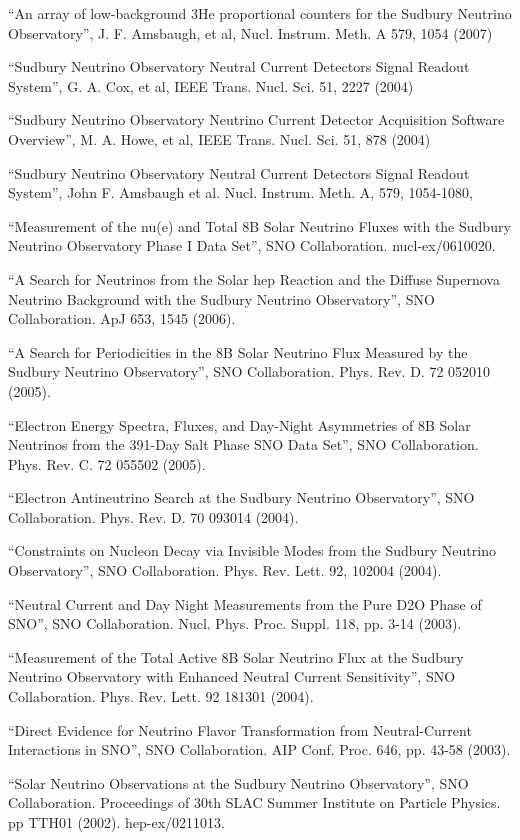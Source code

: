 \documentclass[11pt, a4paper]{article}
\begin{document}
“An array of low-background 3He proportional counters for the Sudbury Neutrino Observatory”, J. F. Amsbaugh, et al, Nucl. Instrum. Meth. A 579, 1054 (2007)

“Sudbury Neutrino Observatory Neutral Current Detectors Signal Readout System”, G. A. Cox, et al, IEEE Trans. Nucl. Sci. 51, 2227 (2004)

“Sudbury Neutrino Observatory Neutrino Current Detector Acquisition Software Overview”, M. A. Howe, et al, IEEE Trans. Nucl. Sci. 51, 878 (2004)

“Sudbury Neutrino Observatory Neutral Current Detectors Signal Readout System”, John F. Amsbaugh et al. Nucl. Instrum. Meth. A, 579, 1054-1080, 

“Measurement of the nu(e) and Total 8B Solar Neutrino Fluxes with the Sudbury Neutrino Observatory Phase I Data Set”, SNO Collaboration.  nucl-ex/0610020.

“A Search for Neutrinos from the Solar hep Reaction and the Diffuse Supernova Neutrino Background with the Sudbury Neutrino Observatory”, SNO Collaboration. ApJ 653, 1545 (2006).

“A Search for Periodicities in the 8B Solar Neutrino Flux Measured by the Sudbury Neutrino Observatory”, SNO Collaboration. Phys. Rev. D. 72 052010 (2005).

“Electron Energy Spectra, Fluxes, and Day-Night Asymmetries of 8B Solar Neutrinos from the 391-Day Salt Phase SNO Data Set”, SNO Collaboration. Phys. Rev. C. 72 055502 (2005).

“Electron Antineutrino Search at the Sudbury Neutrino Observatory”, SNO Collaboration.  Phys. Rev. D. 70 093014 (2004).

“Constraints on Nucleon Decay via Invisible Modes from the Sudbury Neutrino Observatory”, SNO Collaboration.  Phys. Rev. Lett. 92, 102004 (2004).

“Neutral Current and Day Night Measurements from the Pure D2O Phase of SNO”, SNO Collaboration. Nucl. Phys. Proc. Suppl. 118, pp. 3-14 (2003).

“Measurement of the Total Active 8B Solar Neutrino Flux at the Sudbury Neutrino Observatory with Enhanced Neutral Current Sensitivity”, SNO Collaboration. Phys. Rev. Lett. 92 181301 (2004).

“Direct Evidence for Neutrino Flavor Transformation from Neutral-Current Interactions in SNO”, SNO Collaboration. AIP Conf. Proc. 646, pp. 43-58 (2003).

“Solar Neutrino Observations at the Sudbury Neutrino Observatory”, SNO Collaboration.  Proceedings of 30th SLAC Summer Institute on Particle Physics. pp TTH01 (2002).  hep-ex/0211013.
\end{document}
